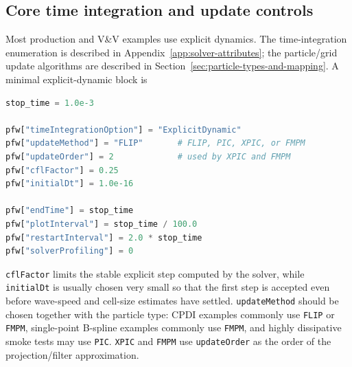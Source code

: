 \subsection{Core time integration and update controls}

Most production and V\&V examples use explicit dynamics.  The time-integration enumeration is described in Appendix~\ref{app:solver-attributes}; the particle/grid update algorithms are described in Section~\ref{sec:particle-types-and-mapping}.  A minimal explicit-dynamic block is

\begin{lstlisting}[language=Python,caption={Minimal explicit-dynamic solver-control block.}]
stop_time = 1.0e-3

pfw["timeIntegrationOption"] = "ExplicitDynamic"
pfw["updateMethod"] = "FLIP"       # FLIP, PIC, XPIC, or FMPM
pfw["updateOrder"] = 2             # used by XPIC and FMPM
pfw["cflFactor"] = 0.25
pfw["initialDt"] = 1.0e-16

pfw["endTime"] = stop_time
pfw["plotInterval"] = stop_time / 100.0
pfw["restartInterval"] = 2.0 * stop_time
pfw["solverProfiling"] = 0
\end{lstlisting}

\texttt{cflFactor} limits the stable explicit step computed by the solver, while \texttt{initialDt} is usually chosen very small so that the first step is accepted even before wave-speed and cell-size estimates have settled.  \texttt{updateMethod} should be chosen together with the particle type: CPDI examples commonly use \texttt{FLIP} or \texttt{FMPM}, single-point B-spline examples commonly use \texttt{FMPM}, and highly dissipative smoke tests may use \texttt{PIC}.  \texttt{XPIC} and \texttt{FMPM} use \texttt{updateOrder} as the order of the projection/filter approximation.

